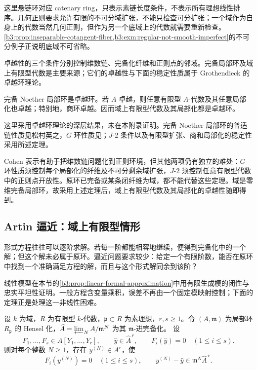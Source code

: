 这里悬链环对应 catenary ring，只表示素链长度条件，不表示所有理想线性排序。几何正则要求允许有限的不可分域扩张，不能只检查可分扩张；一个域作为自身上的代数当然几何正则，但作为另一个底域上的代数就需要重新检查。\cref{b3:prop:inseparable-cotangent-fiber,b3:exm:regular-not-smooth-imperfect}的不可分例子正说明底域不可省略。

\ProseParagraphBreak
卓越性的三个条件分别控制维数链、完备化纤维和正则点的邻域。完备局部环及域上有限型代数是主要来源；它们的卓越性与下面的稳定性质属于 Grothendieck 的卓越环理论。

\begin{theorem}\label{b3:thm:excellent-basic-classes}
	完备 Noether 局部环是卓越环。若 \(A\) 卓越，则任意有限型 \(A\)-代数及其任意局部化也卓越；特别地，商环卓越。因而域上有限型代数及其局部化都是卓越环。
\end{theorem}
\begin{proofsketch}
	这里采用卓越环理论的深层结果，未在本附录证明。完备 Noether 局部环的普适链性质见松村英之\cite[Theorem 29.4(ii), pp. 225--226]{Matsumura1989CommutativeRingTheory}，\(G\) 环性质见\cite[Theorem 32.3, pp. 257--258]{Matsumura1989CommutativeRingTheory}；\(J\)-2 条件以及有限型扩张、商和局部化的稳定性采用\cite[\S32, p. 260]{Matsumura1989CommutativeRingTheory}所述定理。

	Cohen 表示有助于把维数链问题化到正则环境，但其他两项仍有独立的难处：\(G\) 环性质须控制每个局部化的纤维及不可分剩余域扩张，\(J\)-2 须控制任意有限型代数中的正则点开放性。原环已完备或某条闭纤维为域，都不能代替这些定理。域是零维完备局部环，故采用上述定理后，域上有限型代数及其局部化的卓越性随即得到。
\end{proofsketch}

\subsection{Artin 逼近：域上有限型情形}
\label{b3:subsec:D04:02}

形式方程往往可以逐阶求解。若每一阶都能相容地继续，便得到完备化中的一个解；但这个解未必属于原环。逼近问题要求较少：给定一个有限阶数，能否在原环中找到一个准确满足方程的解，而且与这个形式解同余到该阶？

线性模型在本节的\cref{b3:prop:linear-formal-approximation}中用有限生成模的闭性与忠实平坦性证明。一般方程含变量乘积，误差不再由一个固定模映射控制；下面的定理正是处理这一非线性困难。

\begin{theorem}\label{b3:thm:artin-approximation-algebraic}
	设 \(k\) 为域，\(R\) 为有限型 \(k\)-代数，\(\mathfrak p\subset R\) 为素理想，\(r,s\ge1\)。令 \((A,\mathfrak m)\) 为局部环 \(R_{\mathfrak p}\) 的 Hensel 化，\(\widehat A=\varprojlim_N A/\mathfrak m^N\) 为其 \(\mathfrak m\)-进完备化。 设
	\[
		F_1,\ldots,F_s\in A[Y_1,\ldots,Y_r], \qquad \widehat y\in\widehat A^{\,r}, \qquad F_i(\widehat y)=0\quad(1\le i\le s).
	\]
	则对每个整数 \(N\ge1\)，存在 \(y^{(N)}\in A^r\)，使
	\[
		F_i(y^{(N)})=0\quad(1\le i\le s), \qquad y^{(N)}-\widehat y\in\mathfrak m^N\widehat A^{\,r}.
	\]
\end{theorem}

